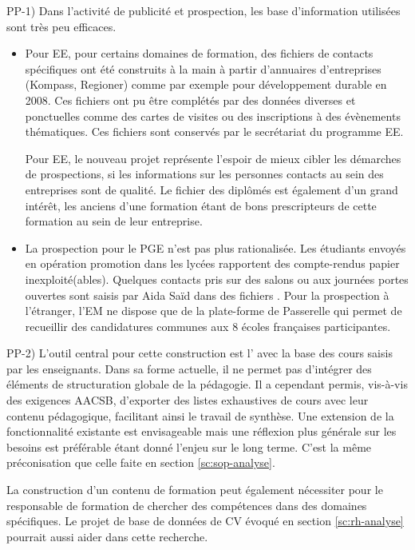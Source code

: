 \documentclass{book}
\begin{document}
PP-1) Dans l'activité de publicité et prospection, les base d'information 
utilisées sont très peu efficaces. 
\begin{itemize}
\item Pour  EE, pour certains  domaines de  formation, des fichiers  de contacts
  spécifiques ont  été construits à  la main à partir  d'annuaires d'entreprises
  (Kompass, Regioner) comme par exemple  pour développement durable en 2008. Ces
  fichiers ont pu  être complétés par des données diverses  et ponctuelles comme
  des cartes de  visites ou des inscriptions à des  évènements thématiques.  Ces
  fichiers sont conservés par le secrétariat du programme EE.

Pour EE, le nouveau projet   représente l'espoir de mieux cibler les
démarches de  prospections, si  les informations sur  les personnes  contacts au
sein des entreprises sont de qualité. Le fichier des diplômés est également d'un
grand intérêt, les anciens d'une formation  étant de bons prescripteurs de cette
formation au sein de leur entreprise.

\item
La prospection pour le PGE n'est pas plus rationalisée. Les étudiants envoyés en
opération  promotion  dans  les   lycées  rapportent  des  compte-rendus  papier
inexploité(ables). Quelques contacts pris sur  des salons ou aux journées portes
ouvertes sont  saisis par Aida  Saïd dans  des fichiers .  Pour la
prospection   à   l'étranger,   l'EM   ne  dispose   que   de   la   plate-forme
  de Passerelle  qui  permet de  recueillir des  candidatures
communes aux 8 écoles françaises participantes. \\
\end{itemize}


PP-2) L'outil  central pour cette  construction est l'  avec la
base des cours saisis par les enseignants.  Dans sa forme actuelle, il ne permet
pas d'intégrer  des éléments  de structuration  globale de  la pédagogie.   Il a
cependant  permis,   vis-à-vis  des  exigences  AACSB,   d'exporter  des  listes
exhaustives de cours avec leur  contenu pédagogique, facilitant ainsi le travail
de synthèse. Une extension de  la fonctionnalité existante est envisageable mais
une réflexion plus  générale sur les besoins est préférable  étant donné l'enjeu
sur  le long  terme. C'est  la  même préconisation  que celle  faite en  section
\ref{sc:sop-analyse}.

La  construction d'un  contenu de  formation peut  également nécessiter  pour le
responsable  de  formation  de  chercher   des  compétences  dans  des  domaines
spécifiques.   Le   projet  de  base  de   données  de  CV  évoqué   en  section
\ref{sc:rh-analyse} pourrait aussi aider dans cette recherche.\\
\end{document}
